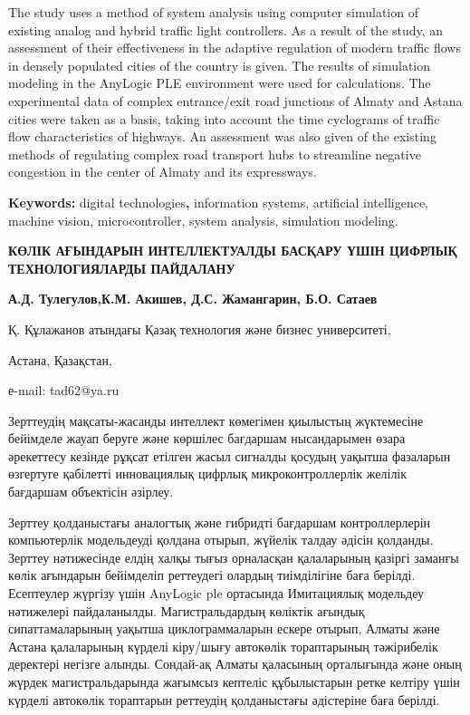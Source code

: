 The study uses a method of system analysis using computer simulation of
existing analog and hybrid traffic light controllers. As a result of the
study, an assessment of their effectiveness in the adaptive regulation
of modern traffic flows in densely populated cities of the country is
given. The results of simulation modeling in the AnyLogic PLE
environment were used for calculations. The experimental data of complex
entrance/exit road junctions of Almaty and Astana cities were taken as a
basis, taking into account the time cyclograms of traffic flow
characteristics of highways. An assessment was also given of the
existing methods of regulating complex road transport hubs to streamline
negative congestion in the center of Almaty and its expressways.

\textbf{Keywords:} digital technologies\textbf{,} information systems,
artificial intelligence, machine vision, microcontroller, system
analysis, simulation modeling.

\textbf{КӨЛІК АҒЫНДАРЫН ИНТЕЛЛЕКТУАЛДЫ БАСҚАРУ ҮШІН ЦИФРЛЫҚ
ТЕХНОЛОГИЯЛАРДЫ ПАЙДАЛАНУ}

\textbf{А.Д. Тулегулов,К.М. Акишев, Д.С. Жамангарин, Б.О. Сатаев}

Қ. Құлажанов атындағы Қазақ технология және бизнес университеті,

Астана, Қазақстан,

е-mail: tad62@ya.ru

Зерттеудің мақсаты-жасанды интеллект көмегімен қиылыстың жүктемесіне
бейімделе жауап беруге және көршілес бағдаршам нысандарымен өзара
әрекеттесу кезінде рұқсат етілген жасыл сигналды қосудың уақытша
фазаларын өзгертуге қабілетті инновациялық цифрлық микроконтроллерлік
желілік бағдаршам объектісін әзірлеу.

Зерттеу қолданыстағы аналогтық және гибридті бағдаршам контроллерлерін
компьютерлік модельдеуді қолдана отырып, жүйелік талдау әдісін қолданды.
Зерттеу нәтижесінде елдің халқы тығыз орналасқан қалаларының қазіргі
заманғы көлік ағындарын бейімделіп реттеудегі олардың тиімділігіне баға
берілді. Есептеулер жүргізу үшін AnyLogic ple ортасында Имитациялық
модельдеу нәтижелері пайдаланылды. Магистральдардың көліктік ағындық
сипаттамаларының уақытша циклограммаларын ескере отырып, Алматы және
Астана қалаларының күрделі кіру/шығу автокөлік тораптарының тәжірибелік
деректері негізге алынды. Сондай-ақ Алматы қаласының орталығында және
оның жүрдек магистральдарында жағымсыз кептеліс құбылыстарын ретке
келтіру үшін күрделі автокөлік тораптарын реттеудің қолданыстағы
әдістеріне баға берілді.

